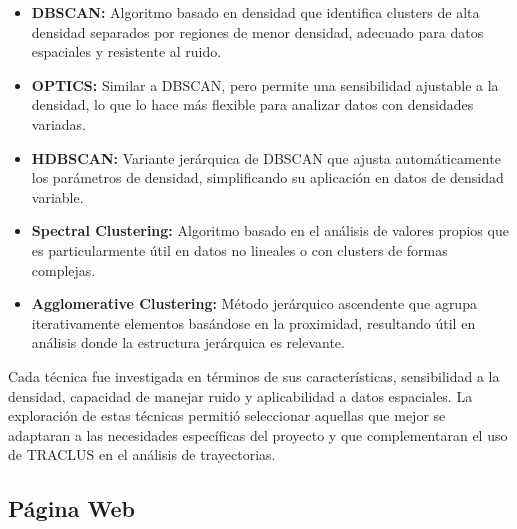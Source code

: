 \begin{itemize}
    \item \textbf{DBSCAN:} Algoritmo basado en densidad que identifica clusters de alta densidad separados por regiones de menor densidad, adecuado para datos espaciales y resistente al ruido.
    
    \item \textbf{OPTICS:} Similar a DBSCAN, pero permite una sensibilidad ajustable a la densidad, lo que lo hace más flexible para analizar datos con densidades variadas.

    \item \textbf{HDBSCAN:} Variante jerárquica de DBSCAN que ajusta automáticamente los parámetros de densidad, simplificando su aplicación en datos de densidad variable.

    \item \textbf{Spectral Clustering:} Algoritmo basado en el análisis de valores propios que es particularmente útil en datos no lineales o con clusters de formas complejas.

    \item \textbf{Agglomerative Clustering:} Método jerárquico ascendente que agrupa iterativamente elementos basándose en la proximidad, resultando útil en análisis donde la estructura jerárquica es relevante.
\end{itemize}

Cada técnica fue investigada en términos de sus características, sensibilidad a la densidad, capacidad de manejar ruido y aplicabilidad a datos espaciales. La exploración de estas técnicas permitió seleccionar aquellas que mejor se adaptaran a las necesidades específicas del proyecto y que complementaran el uso de TRACLUS en el análisis de trayectorias.

\subsection{Página Web}

